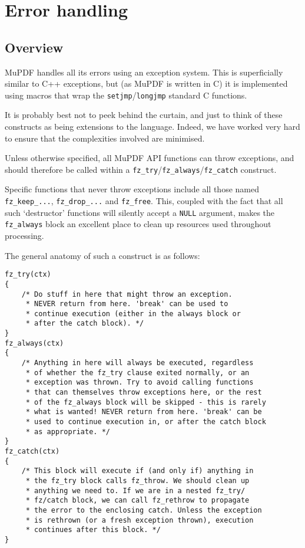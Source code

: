 \documentclass[oneside]{book}
\begin{document}
\chapter{Error handling}
\label{ErrorHandling}

\section{Overview}

MuPDF handles all its errors using an exception system. This is superficially similar to C++ exceptions, but (as MuPDF is written in C) it is implemented using macros that wrap the \texttt{setjmp}\slash \texttt{longjmp} standard C functions.

It is probably best not to peek behind the curtain, and just to think of these constructs as being extensions to the language. Indeed, we have worked very hard to ensure that the complexities involved are minimised.

Unless otherwise specified, all MuPDF API functions can throw exceptions, and should therefore be called within a \texttt{fz\_try}\slash\texttt{fz\_always}\slash\texttt{fz\_catch} construct.

Specific functions that never throw exceptions include all those named \texttt{fz\_keep\_...}, \texttt{fz\_drop\_...} and \texttt{fz\_free}. This, coupled with the fact that all such `destructor' functions will silently accept a \texttt{NULL} argument, makes the \texttt{fz\_always} block an excellent place to clean up resources used throughout processing.

The general anatomy of such a construct is as follows:

\begin{lstlisting}
fz_try(ctx)
{
    /* Do stuff in here that might throw an exception.
     * NEVER return from here. 'break' can be used to
     * continue execution (either in the always block or
     * after the catch block). */
}
fz_always(ctx)
{
    /* Anything in here will always be executed, regardless
     * of whether the fz_try clause exited normally, or an
     * exception was thrown. Try to avoid calling functions
     * that can themselves throw exceptions here, or the rest
     * of the fz_always block will be skipped - this is rarely
     * what is wanted! NEVER return from here. 'break' can be
     * used to continue execution in, or after the catch block
     * as appropriate. */
}
fz_catch(ctx)
{
    /* This block will execute if (and only if) anything in
     * the fz_try block calls fz_throw. We should clean up
     * anything we need to. If we are in a nested fz_try/
     * fz/catch block, we can call fz_rethrow to propagate
     * the error to the enclosing catch. Unless the exception
     * is rethrown (or a fresh exception thrown), execution
     * continues after this block. */
}
\end{lstlisting}
\end{document}
